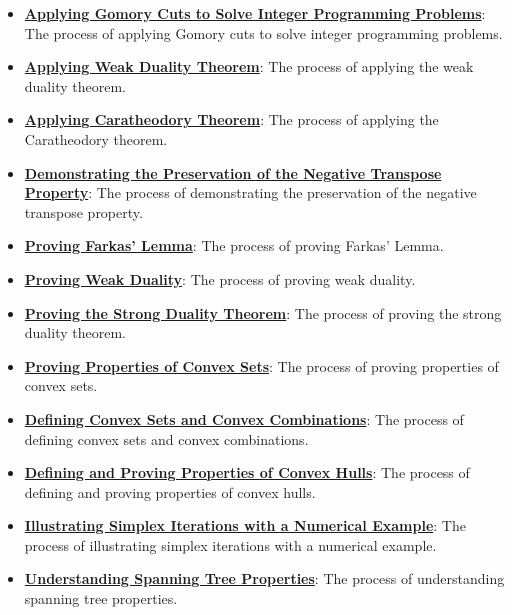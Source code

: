 \documentclass{article}%
\begin{document}
\begin{itemize}[leftmargin=*]
\item \href{https://www.math.purdue.edu/~yipn/421/2024-11-14-NetAppls.pdf#page=7}{\textbf{Applying Gomory Cuts to Solve Integer Programming Problems}}: The process of applying Gomory cuts to solve integer programming problems.%
\item \href{https://www.math.purdue.edu/~yipn/421/2024-11-14-NetAppls.pdf#page=7}{\textbf{Applying Weak Duality Theorem}}: The process of applying the weak duality theorem.%
\item \href{https://www.math.purdue.edu/~yipn/421/2024-11-14-NetAppls.pdf#page=7}{\textbf{Applying Caratheodory Theorem}}: The process of applying the Caratheodory theorem.%
\item \href{https://www.math.purdue.edu/~yipn/421/2024-11-14-NetAppls.pdf#page=7}{\textbf{Demonstrating the Preservation of the Negative Transpose Property}}: The process of demonstrating the preservation of the negative transpose property.%
\item \href{https://www.math.purdue.edu/~yipn/421/2024-11-14-NetAppls.pdf#page=7}{\textbf{Proving Farkas' Lemma}}: The process of proving Farkas' Lemma.%
\item \href{https://www.math.purdue.edu/~yipn/421/2024-11-14-NetAppls.pdf#page=7}{\textbf{Proving Weak Duality}}: The process of proving weak duality.%
\item \href{https://www.math.purdue.edu/~yipn/421/2024-11-14-NetAppls.pdf#page=7}{\textbf{Proving the Strong Duality Theorem}}: The process of proving the strong duality theorem.%
\item \href{https://www.math.purdue.edu/~yipn/421/2024-11-14-NetAppls.pdf#page=7}{\textbf{Proving Properties of Convex Sets}}: The process of proving properties of convex sets.%
\item \href{https://www.math.purdue.edu/~yipn/421/2024-11-14-NetAppls.pdf#page=7}{\textbf{Defining Convex Sets and Convex Combinations}}: The process of defining convex sets and convex combinations.%
\item \href{https://www.math.purdue.edu/~yipn/421/2024-11-14-NetAppls.pdf#page=7}{\textbf{Defining and Proving Properties of Convex Hulls}}: The process of defining and proving properties of convex hulls.%
\item \href{https://www.math.purdue.edu/~yipn/421/2024-11-14-NetAppls.pdf#page=7}{\textbf{Illustrating Simplex Iterations with a Numerical Example}}: The process of illustrating simplex iterations with a numerical example.%
\item \href{https://www.math.purdue.edu/~yipn/421/2024-11-14-NetAppls.pdf#page=7}{\textbf{Understanding Spanning Tree Properties}}: The process of understanding spanning tree properties.%

\end{itemize}
\end{document}
